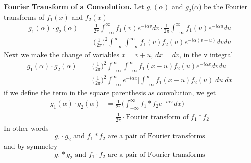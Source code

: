 \documentclass[../main.tex]{subfiles}
\begin{document}
\textbf{Fourier Transform of a Convolution.} Let $g_1(\alpha)$ and $g_2(\alpha$) be the Fourier transforms of $f_1(x)$ and $f_2(x)$
\begin{align*}
    g_1(\alpha)\cdot g_2(\alpha)&=\frac{1}{2\pi}\int_{-\infty}^{\infty}f_1(v)e^{-i\alpha v}dv\cdot \frac{1}{2\pi}\int_{-\infty}^{\infty}f_1(u)e^{-i\alpha u}du\\
    &=\biggl(\frac{1}{2\pi}\biggr)^2\int_{-\infty}^{\infty}\int_{-\infty}^{\infty} f_1(v)f_2(u)e^{-i\alpha (v+u)}dvdu
\end{align*}
Next we make the change of variables $x = v + u$, $dx = dv$, in the v integral
\begin{align*}
    g_1(\alpha)\cdot g_2(\alpha)&= \biggl(\frac{1}{2\pi}\biggr)^2\int_{-\infty}^{\infty}\int_{-\infty}^{\infty} f_1(x-u)f_2(u)e^{-i\alpha x}dvdu\\
    &= \biggl(\frac{1}{2\pi}\biggr)^2\int_{-\infty}^{\infty}e^{-i\alpha x}\biggl[\int_{-\infty}^{\infty}f_1(x-u)f_2(u)\;du\biggr]dx
\end{align*}
if we define the term in the square parenthesis as convolution, we get 
\begin{align*}
    g_1(\alpha)\cdot g_2(\alpha)&=\frac{1}{2\pi}\biggl(\int_{-\infty}^{\infty}f_1*f_2e^{-i\alpha x}dx\biggr)\\
    &=\frac{1}{2\pi}\cdot\text{Fourier transform of }f_1*f_2
\end{align*}
In other words
\begin{equation*}
    g_1\cdot g_2\text{ and }f_1*f_2\text{ are a pair of Fourier transforms}
\end{equation*}
and by symmetry 
\begin{equation*}
    g_1* g_2\text{ and }f_1\cdot f_2\text{ are a pair of Fourier transforms}
\end{equation*}
\end{document}
